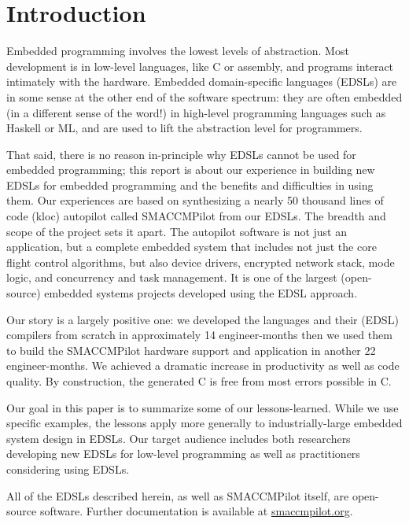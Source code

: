\section{Introduction}

Embedded programming involves the lowest levels of abstraction.  Most development
is in low-level languages, like C or assembly, and programs interact intimately
with the hardware.  Embedded domain-specific languages (EDSLs) are in
some sense at the other end of the software spectrum: they are often embedded
(in a different sense of the word!) in high-level programming languages such as
Haskell or ML, and are used to lift the abstraction level for programmers.

That said, there is no reason in-principle why EDSLs cannot be used for embedded
programming; this report is about our experience in building new EDSLs for
embedded programming and the benefits and difficulties in using them.  Our
experiences are based on synthesizing a nearly 50 thousand lines of code (kloc)
autopilot called SMACCMPilot from our EDSLs.  The breadth and scope of the
project sets it apart.  The autopilot software is not just an application, but a
complete embedded system that includes not just the core flight control
algorithms, but also device drivers, encrypted network stack, mode logic, and
concurrency and task management.  It is one of the largest (open-source)
embedded systems projects developed using the EDSL approach.

Our story is a largely positive one: we developed the languages and their (EDSL)
compilers from scratch in approximately 14 engineer-months then we used them to
build the SMACCMPilot hardware support and application in another 22
engineer-months.  We achieved a dramatic increase in productivity as well as
code quality.  By construction, the generated C is free from most errors
possible in C.

Our goal in this paper is to summarize some of our lessons-learned.  While we
use specific examples, the lessons apply more generally to industrially-large
embedded system design in EDSLs.  Our target audience includes both researchers
developing new EDSLs for low-level programming as well as practitioners
considering using EDSLs.

All of the EDSLs described herein, as well as SMACCMPilot itself, are
open-source software. Further documentation is available at \url{smaccmpilot.org}.




